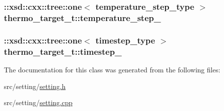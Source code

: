 \subsubsection[{\texorpdfstring{temperature\+\_\+step\+\_\+}{temperature_step_}}]{\setlength{\rightskip}{0pt plus 5cm}\+::xsd\+::cxx\+::tree\+::one$<$ {\bf temperature\+\_\+step\+\_\+type} $>$ thermo\+\_\+target\+\_\+t\+::temperature\+\_\+step\+\_\+\hspace{0.3cm}{\ttfamily [protected]}}\hypertarget{classthermo__target__t_a235f5881ea574b7a2fe9c99a7e8355d8}{}\label{classthermo__target__t_a235f5881ea574b7a2fe9c99a7e8355d8}
\subsubsection[{\texorpdfstring{timestep\+\_\+}{timestep_}}]{\setlength{\rightskip}{0pt plus 5cm}\+::xsd\+::cxx\+::tree\+::one$<$ {\bf timestep\+\_\+type} $>$ thermo\+\_\+target\+\_\+t\+::timestep\+\_\+\hspace{0.3cm}{\ttfamily [protected]}}\hypertarget{classthermo__target__t_ad1a9748cb191953440a11daf88753803}{}\label{classthermo__target__t_ad1a9748cb191953440a11daf88753803}


The documentation for this class was generated from the following files\+:\begin{DoxyCompactItemize}
\item 
src/setting/\hyperlink{setting_8h}{setting.\+h}\item 
src/setting/\hyperlink{setting_8cpp}{setting.\+cpp}\end{DoxyCompactItemize}
